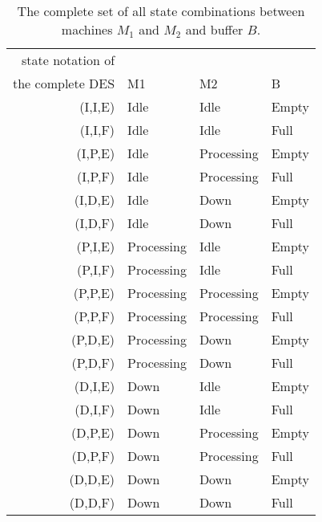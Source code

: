 \begin{table}[H]\centering
    \begin{tabular}{r|lll}
    state notation of \\ the complete DES & M1         & M2         & B     \\ \hline
    (I,I,E)                            & Idle       & Idle       & Empty \\
    (I,I,F)                            & Idle       & Idle       & Full  \\
    (I,P,E)                            & Idle       & Processing & Empty \\
    (I,P,F)                            & Idle       & Processing & Full  \\
    (I,D,E)                            & Idle       & Down       & Empty \\
    (I,D,F)                            & Idle       & Down       & Full  \\
    (P,I,E)                            & Processing & Idle       & Empty \\
    (P,I,F)                            & Processing & Idle       & Full  \\
    (P,P,E)                            & Processing & Processing & Empty \\
    (P,P,F)                            & Processing & Processing & Full  \\
    (P,D,E)                            & Processing & Down       & Empty \\
    (P,D,F)                            & Processing & Down       & Full  \\
    (D,I,E)                            & Down       & Idle       & Empty \\
    (D,I,F)                            & Down       & Idle       & Full  \\
    (D,P,E)                            & Down       & Processing & Empty \\
    (D,P,F)                            & Down       & Processing & Full  \\
    (D,D,E)                            & Down       & Down       & Empty \\
    (D,D,F)                            & Down       & Down       & Full  \\
    \end{tabular}
    \caption{The complete set of all state combinations between machines $M_1$
      and $M_2$ and buffer $B$.}
    \label{tbl:04.02_all_states}
\end{table}


